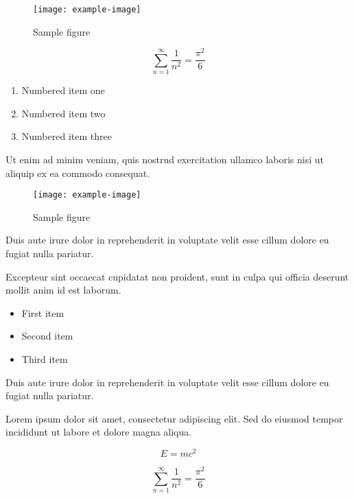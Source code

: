 \documentclass{article}
\begin{document}
\begin{figure}[h]
    \centering
    \texttt{[image: example-image]}
    \caption{Sample figure}
    \label{fig:sample}
\end{figure}

\begin{equation}
    \sum_{n=1}^{\infty} \frac{1}{n^2} = \frac{\pi^2}{6}
\end{equation}

\begin{enumerate}
\item Numbered item one
\item Numbered item two
\item Numbered item three
\end{enumerate}

Ut enim ad minim veniam, quis nostrud exercitation ullamco laboris nisi ut aliquip ex ea commodo consequat.

\begin{figure}[h]
    \centering
    \texttt{[image: example-image]}
    \caption{Sample figure}
    \label{fig:sample}
\end{figure}

Duis aute irure dolor in reprehenderit in voluptate velit esse cillum dolore eu fugiat nulla pariatur.

Excepteur sint occaecat cupidatat non proident, sunt in culpa qui officia deserunt mollit anim id est laborum.

\begin{itemize}
\item First item
\item Second item
\item Third item
\end{itemize}

Duis aute irure dolor in reprehenderit in voluptate velit esse cillum dolore eu fugiat nulla pariatur.

Lorem ipsum dolor sit amet, consectetur adipiscing elit. Sed do eiusmod tempor incididunt ut labore et dolore magna aliqua.

\begin{equation}
    E = mc^2
\end{equation}

\begin{equation}
    \sum_{n=1}^{\infty} \frac{1}{n^2} = \frac{\pi^2}{6}
\end{equation}
\end{document}
